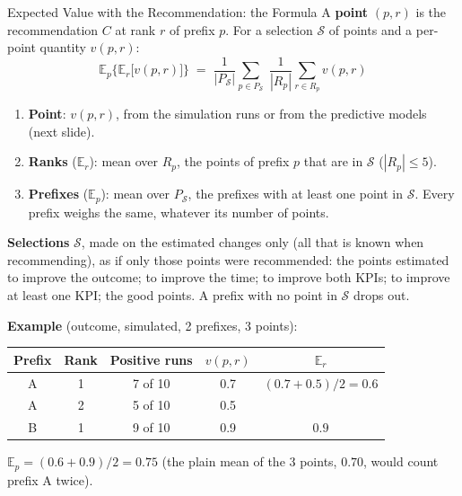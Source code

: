 \documentclass[aspectratio=169]{beamer} %
\begin{document}
\begin{frame}{Expected Value with the Recommendation: the Formula}
  \scriptsize\setlength{\abovedisplayskip}{2pt}\setlength{\belowdisplayskip}{2pt}
  A \textbf{point} $(p, r)$ is the recommendation $C$ at rank $r$ of prefix $p$. For a selection $\mathcal{S}$ of
  points and a per-point quantity $v(p,r)$:
  \[
    \mathbb{E}_p\Big\{\mathbb{E}_r\big[v(p,r)\big]\Big\}
    \;=\; \frac{1}{|P_{\mathcal{S}}|} \sum_{p \in P_{\mathcal{S}}} \;
    \frac{1}{|R_p|} \sum_{r \in R_p} v(p,r)
  \]
  \vspace{-0.2cm}
  \begin{enumerate}
    \item \textbf{Point}: $v(p,r)$, from the simulation runs or from the predictive models (next slide).
    \item \textbf{Ranks} ($\mathbb{E}_r$): mean over $R_p$, the points of prefix $p$ that are in $\mathcal{S}$ ($|R_p| \le 5$).
    \item \textbf{Prefixes} ($\mathbb{E}_p$): mean over $P_{\mathcal{S}}$, the prefixes with at least one point in
      $\mathcal{S}$. Every prefix weighs the same, whatever its number of points.
  \end{enumerate}
  \textbf{Selections} $\mathcal{S}$, made on the estimated changes only (all that is known when recommending), as if
  only those points were recommended: the points estimated to improve the outcome; to improve the time; to improve
  both KPIs; to improve at least one KPI; the good points. A prefix with no point in $\mathcal{S}$ drops out.

  \textbf{Example} (outcome, simulated, 2 prefixes, 3 points):
  \begin{center}\setlength{\tabcolsep}{5pt}\setlength{\aboverulesep}{0pt}\setlength{\belowrulesep}{1pt}
  \begin{tabular}{ccccc}
    \toprule
    Prefix & Rank & Positive runs & $v(p,r)$ & $\mathbb{E}_r$ \\
    \midrule
    A & 1 & 7 of 10 & 0.7 & $(0.7 + 0.5)/2 = 0.6$ \\
    A & 2 & 5 of 10 & 0.5 & \\
    B & 1 & 9 of 10 & 0.9 & $0.9$ \\
    \bottomrule
  \end{tabular}
  \end{center}
  \vspace{-0.1cm}
  $\mathbb{E}_p = (0.6 + 0.9)/2 = \mathbf{0.75}$ (the plain mean of the 3 points, $0.70$, would count prefix A twice).
\end{frame}
\end{document}
